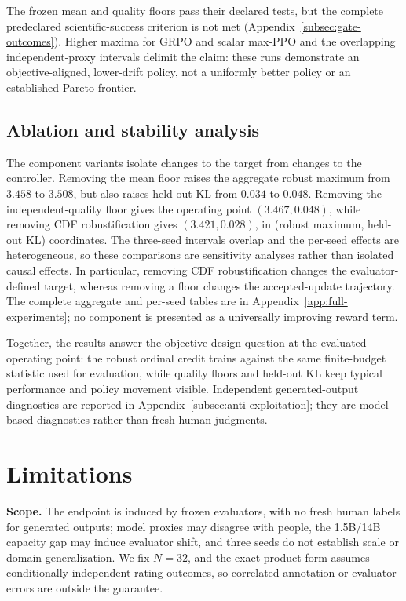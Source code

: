 \documentclass{article}
\theoremstyle{definition}
\theoremstyle{remark}
\begin{document}
The frozen mean and quality floors pass their declared tests, but the complete
predeclared scientific-success criterion is not met
(Appendix~\ref{subsec:gate-outcomes}). Higher maxima for GRPO and scalar
max-PPO and the overlapping independent-proxy intervals delimit the claim:
these runs demonstrate an objective-aligned, lower-drift policy, not a
uniformly better policy or an established Pareto frontier.

\subsection{Ablation and stability analysis}
\label{subsec:ablation-stability-main}
The component variants isolate changes to the target from changes to the
controller.  Removing the mean floor raises the aggregate robust maximum from
\(3.458\) to \(3.508\), but also raises held-out KL from \(0.034\) to \(0.048\).
Removing the independent-quality floor gives the operating point
\((3.467,0.048)\), while removing CDF robustification gives
\((3.421,0.028)\), in (robust maximum, held-out KL) coordinates.  The
three-seed intervals overlap and the per-seed effects are heterogeneous, so
these comparisons are sensitivity analyses rather than isolated causal
effects.  In particular, removing CDF robustification changes the evaluator-defined
target, whereas removing a floor changes the accepted-update trajectory.  The
complete aggregate and per-seed tables are in
Appendix~\ref{app:full-experiments}; no component is presented as a universally
improving reward term.

Together, the results answer the objective-design question at the evaluated
operating point: the robust ordinal credit trains against the same
finite-budget statistic used for evaluation, while quality floors and held-out
KL keep typical performance and policy movement visible.  Independent
generated-output diagnostics are reported in
Appendix~\ref{subsec:anti-exploitation}; they are model-based diagnostics
rather than fresh human judgments.

\section{Limitations}
\label{sec:limitations}
\textbf{Scope.} The endpoint is induced by frozen evaluators, with no fresh human
labels for generated outputs; model proxies may disagree with people, the
1.5B/14B capacity gap may induce evaluator shift, and three seeds do not
establish scale or domain generalization.  We fix \(N=32\), and the exact
product form assumes conditionally independent rating outcomes, so correlated
annotation or evaluator errors are outside the guarantee.
\end{document}
